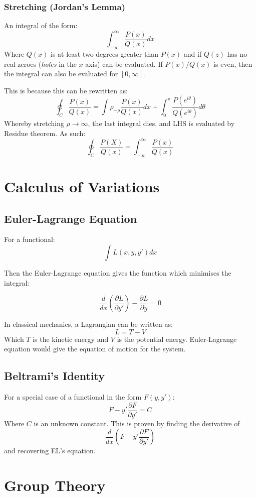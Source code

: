 \documentclass[12pt]{article}
\begin{document}
\subsubsection{Stretching (Jordan's Lemma)}
An integral of the form:
\[ \int^\infty_{-\infty}\frac{P(x)}{Q(x)}dx\]
Where $Q(x)$ is at least two degrees greater than $P(x)$ and if $Q(z)$ has no real zeroes (\textit{holes} in the $x$ axis) can be evaluated. If $P(x)/Q(x)$ is even, then the integral can also be evaluated for $[0,\infty]$.

This is because this can be rewritten as:
\[\oint_C\frac{P(x)}{Q(x)} = \int\rho_{-\rho}\frac{P(x)}{Q(x)}dx + \int_0^\pi \frac{P(e^{i\theta})}{Q(e^{i\theta})}d\theta\]
Whereby stretching $\rho\to\infty$, the last integral dies, and LHS is evaluated by Residue theorem. As such:
\[\oint_C \frac{P(X)}{Q(x)} = \int^\infty_{-\infty}\frac{P(x)}{Q(x)}\]


\section{Calculus of Variations}

\subsection{Euler-Lagrange Equation}
For a functional:
\[ \int L(x,y,y') dx\]

Then the Euler-Lagrange equation gives the function which minimises the integral:

\[ \frac{d}{dx}\left(\frac{\partial L}{\partial y'} \right) -\frac{\partial L}{\partial y} = 0\]

In classical mechanics, a Lagrangian can be written as:
\[ L = T -V\]
Which $T$ is the kinetic energy and $V$ is the potential energy. Euler-Lagrange equation would give the equation of motion for the system.

\subsection{Beltrami's Identity}
For a special case of a functional in the form $F(y,y')$:
\[ F - y'\frac{\partial F}{\partial y'} = C\]
Where $C$ is an unknown constant. This is proven by finding the derivative of \[ \frac{d}{dx}\left(F - y'\frac{\partial F}{\partial y'}\right)\] and recovering EL's equation. 


\section{Group Theory}
\end{document}
